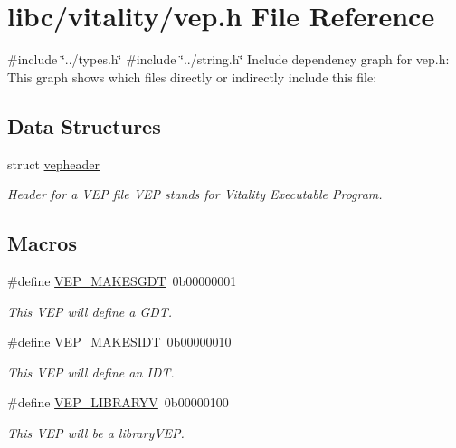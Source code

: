 \hypertarget{a00062}{}\section{libc/vitality/vep.h File Reference}
\label{a00062}
{\ttfamily \#include \char`\"{}../types.\+h\char`\"{}}\newline
{\ttfamily \#include \char`\"{}../string.\+h\char`\"{}}\newline
Include dependency graph for vep.\+h\+:
This graph shows which files directly or indirectly include this file\+:
\subsection*{Data Structures}
\begin{DoxyCompactItemize}
\item 
struct \hyperlink{a00080}{vepheader}
\begin{DoxyCompactList}\small\item\em Header for a V\+EP file V\+EP stands for Vitality Executable Program. \end{DoxyCompactList}\end{DoxyCompactItemize}
\subsection*{Macros}
\begin{DoxyCompactItemize}
\item 
\#define \hyperlink{a00062_a07092a70a7d784c7a3c3d605cea807af_a07092a70a7d784c7a3c3d605cea807af}{V\+E\+P\+\_\+\+M\+A\+K\+E\+S\+G\+DT}~0b00000001
\begin{DoxyCompactList}\small\item\em This V\+EP will define a G\+DT. \end{DoxyCompactList}\item 
\#define \hyperlink{a00062_a9167064be23f5789ed435d3a9edbb475_a9167064be23f5789ed435d3a9edbb475}{V\+E\+P\+\_\+\+M\+A\+K\+E\+S\+I\+DT}~0b00000010
\begin{DoxyCompactList}\small\item\em This V\+EP will define an I\+DT. \end{DoxyCompactList}\item 
\#define \hyperlink{a00062_a269ec657dd35349b74056083e6ba09c0_a269ec657dd35349b74056083e6ba09c0}{V\+E\+P\+\_\+\+L\+I\+B\+R\+A\+R\+YV}~0b00000100
\begin{DoxyCompactList}\small\item\em This V\+EP will be a library\+V\+EP. \end{DoxyCompactList}\end{DoxyCompactItemize}

